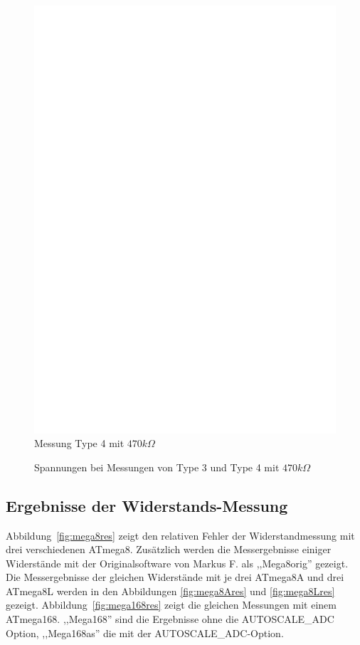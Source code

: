 \begin{figure}[H]
 \centering
 \includegraphics[]{../FIG/ResistormessH2.eps}
 \caption{Messung Type 4 mit \(470k\Omega\) }
\label{fig:RH2mes}
\end{figure}

\begin{figure}[H]
\centering

\caption{Spannungen bei Messungen von Type 3 und Type 4  mit \(470k\Omega\) }
\label{fig:RHv}
\end{figure}

\subsection{Ergebnisse der Widerstands-Messung}
Abbildung~\ref{fig:mega8res} zeigt den relativen Fehler der Widerstandmessung mit drei verschiedenen ATmega8. 
Zusätzlich werden die Messergebnisse einiger Widerstände mit der Originalsoftware von Markus F. als
,,Mega8orig'' gezeigt.
Die Messergebnisse der gleichen Widerstände mit je drei ATmega8A und drei ATmega8L werden in den Abbildungen
\ref{fig:mega8Ares} und \ref{fig:mega8Lres} gezeigt.
Abbildung~\ref{fig:mega168res} zeigt die gleichen Messungen mit einem ATmega168.
,,Mega168'' sind die Ergebnisse ohne die AUTOSCALE\_ADC Option, ,,Mega168as'' die mit der
 AUTOSCALE\_ADC-Option.

